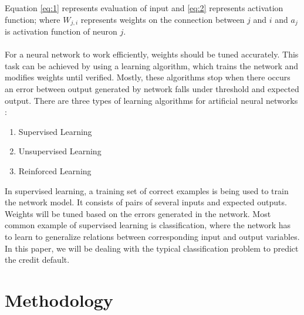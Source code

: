 \documentclass{article}[]
\begin{document}
Equation \ref{eq:1} represents evaluation of input and \ref{eq:2} represents activation function; where $W_{j,i}$ represents weights on the connection between $j$ and $i$ and $a_{j}$ is activation function of neuron $j$.\\\\
For a neural network to work efficiently, weights should be tuned accurately. This task can be achieved by using a learning algorithm, which trains the network and modifies weights until verified. Mostly, these algorithms stop when there occurs an error between output generated by network falls under threshold and expected output. There are three types of learning algorithms for artificial neural networks \cite{angelini2008neural}:
\begin{enumerate}
\item Supervised Learning
\item Unsupervised Learning
\item Reinforced Learning
\end{enumerate}

In supervised learning, a training set of correct examples is being used to train the network model. It consists of pairs of several inputs and expected outputs. Weights will be tuned based on the errors generated in the network. Most common example of supervised learning is classification, where the network has to learn to generalize relations between corresponding input and output variables. In this paper, we will be dealing with the typical classification problem to predict the credit default. 

\section{Methodology}

 
\end{document}

